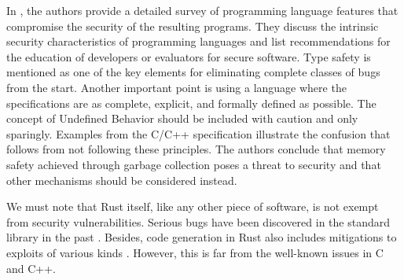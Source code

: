\documentclass[../Thesis.tex]{subfiles}
\begin{document}
In \cite{jaeger2014mind}, the authors provide
a detailed survey of programming language features that
compromise the security of the resulting programs.
They discuss the intrinsic security characteristics of programming languages
and list recommendations for the education of developers or evaluators for secure software.
Type safety is mentioned as one of the key elements
for eliminating complete classes of bugs from the start.
Another important point is using a language where the specifications are
as complete, explicit, and formally defined as possible.
The concept of Undefined Behavior should be included with caution and only sparingly.
Examples from the C/C++ specification illustrate the confusion
that follows from not following these principles.
The authors conclude that memory safety achieved
through garbage collection poses a threat to security
and that other mechanisms should be considered instead.

We must note that Rust itself, like any other piece of software,
is not exempt from security vulnerabilities.
Serious bugs have been discovered in the standard library in the past \cite{davidoff2018}.
Besides, code generation in Rust also includes mitigations
to exploits of various kinds \cite[Chap. 11]{rustc-book}.
However, this is far from the well-known issues in C and C++.
\end{document}
